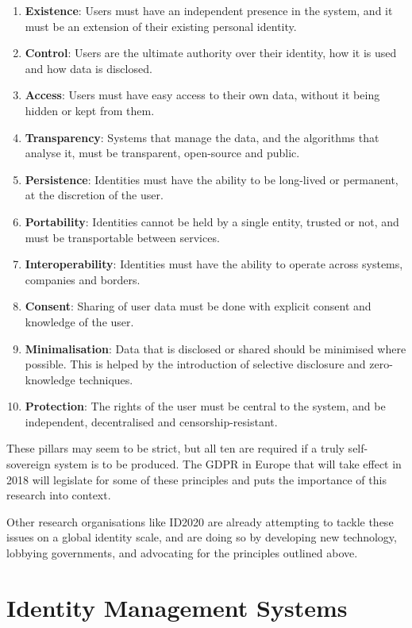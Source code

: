 \begin{enumerate}
	\item \textbf{Existence}: Users must have an independent presence in the system, and it must be an extension of their existing personal identity.
	\item \textbf{Control}: Users are the ultimate authority over their identity, how it is used and how data is disclosed.
	\item \textbf{Access}: Users must have easy access to their own data, without it being hidden or kept from them.
	\item \textbf{Transparency}: Systems that manage the data, and the algorithms that analyse it, must be transparent, open-source and public.
	\item \textbf{Persistence}: Identities must have the ability to be long-lived or permanent, at the discretion of the user.
	\item \textbf{Portability}: Identities cannot be held by a single entity, trusted or not, and must be transportable between services.
	\item \textbf{Interoperability}: Identities must have the ability to operate across systems, companies and borders.
	\item \textbf{Consent}: Sharing of user data must be done with explicit consent and knowledge of the user.
	\item \textbf{Minimalisation}: Data that is disclosed or shared should be minimised where possible. This is helped by the introduction of selective disclosure and zero-knowledge techniques.
	\item \textbf{Protection}: The rights of the user must be central to the system, and be independent, decentralised and censorship-resistant.
\end{enumerate}

These pillars may seem to be strict, but all ten are required if a truly self-sovereign system is to be produced. The \ac{GDPR} in Europe \cite{european_parliament_eu_nodate} that will take effect in 2018 will legislate for some of these principles and puts the importance of this research into context.

Other research organisations like ID2020 \cite{identity2020_systems_inc_id2020_nodate} are already attempting to tackle these issues on a global identity scale, and are doing so by developing new technology, lobbying governments, and advocating for the principles outlined above.

\section{Identity Management Systems}
